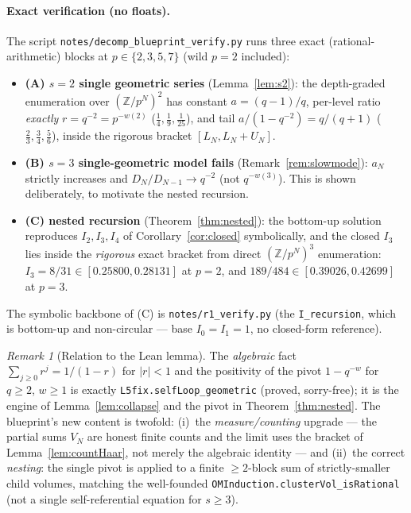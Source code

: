 \documentclass[11pt]{article}
\theoremstyle{definition}
\theoremstyle{remark}
\newtheorem{remark}[theorem]{Remark}
\begin{document}
\paragraph{Exact verification (no floats).}
The script \texttt{notes/decomp\_blueprint\_verify.py} runs three exact
(rational-arithmetic) blocks at $p\in\{2,3,5,7\}$ (wild $p=2$ included):
\begin{itemize}[nosep]
\item \textbf{(A) $s=2$ single geometric series} (Lemma~\ref{lem:s2}): the
depth-graded enumeration over $(\mathbb Z/p^N)^2$ has constant $a=(q-1)/q$, per-level
ratio \emph{exactly} $r=q^{-2}=p^{-w(2)}$ ($\tfrac14,\tfrac19,\tfrac1{25}$), and tail
$a/(1-q^{-2})=q/(q+1)$ ($\tfrac23,\tfrac34,\tfrac56$), inside the rigorous bracket
$[L_N,L_N+U_N]$.
\item \textbf{(B) $s=3$ single-geometric model fails} (Remark~\ref{rem:slowmode}):
$a_N$ strictly increases and $D_N/D_{N-1}\to q^{-2}$ (not $q^{-w(3)}$). This is shown
deliberately, to motivate the nested recursion.
\item \textbf{(C) nested recursion} (Theorem~\ref{thm:nested}): the bottom-up
solution reproduces $I_2,I_3,I_4$ of Corollary~\ref{cor:closed} symbolically, and
the closed $I_3$ lies inside the \emph{rigorous} exact bracket from direct
$(\mathbb Z/p^N)^3$ enumeration: $I_3=8/31\in[0.25800,0.28131]$ at $p=2$, and
$189/484\in[0.39026,0.42699]$ at $p=3$.
\end{itemize}
The symbolic backbone of (C) is \texttt{notes/r1\_verify.py} (the \texttt{I\_recursion},
which is bottom-up and non-circular --- base $I_0=I_1=1$, no closed-form reference).

\begin{remark}[Relation to the Lean lemma]
The \emph{algebraic} fact $\sum_{j\ge0}r^j=1/(1-r)$ for $|r|<1$ and the positivity of
the pivot $1-q^{-w}$ for $q\ge2$, $w\ge1$ is exactly
\texttt{L5fix.selfLoop\_geometric} (proved, sorry-free); it is the engine of
Lemma~\ref{lem:collapse} and the pivot in Theorem~\ref{thm:nested}. The blueprint's
new content is twofold: (i)~the \emph{measure/counting} upgrade --- the partial sums
$V_N$ are honest finite counts and the limit uses the bracket of
Lemma~\ref{lem:countHaar}, not merely the algebraic identity --- and (ii)~the correct
\emph{nesting}: the single pivot is applied to a finite $\ge2$-block sum of
strictly-smaller child volumes, matching the well-founded
\texttt{OMInduction.clusterVol\_isRational} (not a single self-referential equation
for $s\ge3$).
\end{remark}
\end{document}

